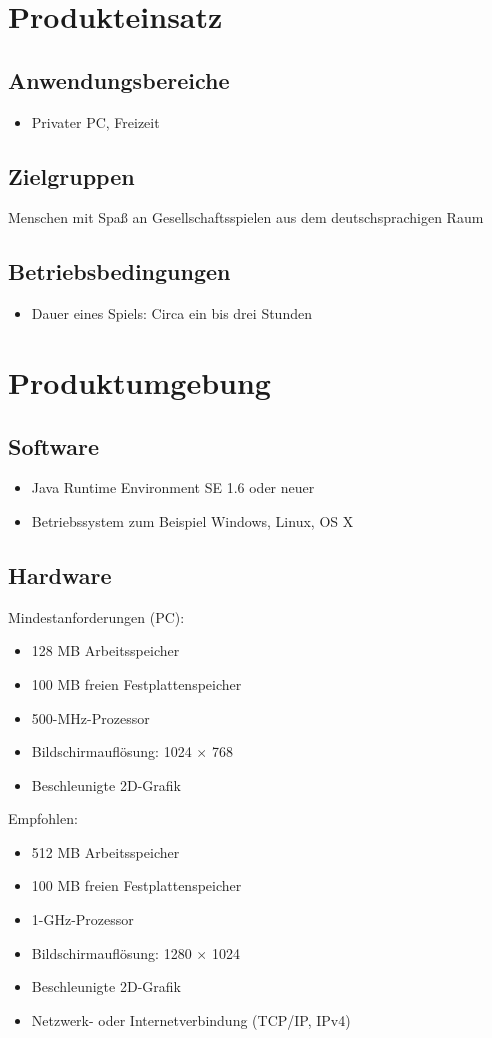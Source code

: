 \documentclass[a4paper,10pt]{article}
\begin{document}
\section{Produkteinsatz}
\subsection{Anwendungsbereiche}
\begin{itemize}
\item Privater PC, Freizeit
\end{itemize}
\subsection{Zielgruppen}
Menschen mit Spaß an Gesellschaftsspielen aus dem deutschsprachigen Raum
\subsection{Betriebsbedingungen}
\begin{itemize}
\item Dauer eines Spiels: Circa ein bis drei Stunden
\end{itemize}
\section{Produktumgebung}
\subsection{Software}
\begin{itemize}
\item Java Runtime Environment SE 1.6 oder neuer
\item Betriebssystem zum Beispiel Windows, Linux, OS X
\end{itemize}
\subsection{Hardware}
Mindestanforderungen (PC): 
\begin{itemize}
\item 128 MB Arbeitsspeicher
\item 100 MB freien Festplattenspeicher
\item 500-MHz-Prozessor
\item Bildschirmauflösung: 1024 $\times$ 768
\item Beschleunigte 2D-Grafik
\end{itemize}
Empfohlen:
\begin{itemize}
\item 512 MB Arbeitsspeicher
\item 100 MB freien Festplattenspeicher
\item 1-GHz-Prozessor
\item Bildschirmauflösung: 1280 $\times$ 1024
\item Beschleunigte 2D-Grafik
\item Netzwerk- oder Internetverbindung (TCP/IP, IPv4)
\end{itemize}
\end{document}
